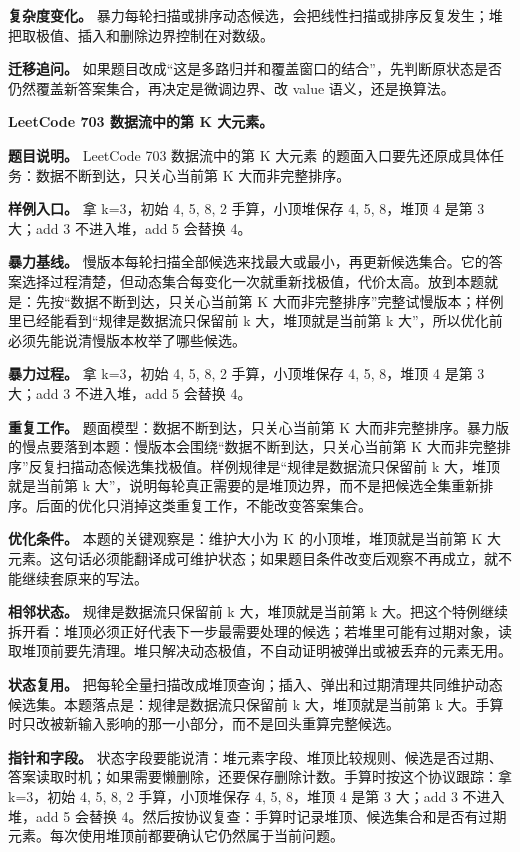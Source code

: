 \textbf{复杂度变化。} 暴力每轮扫描或排序动态候选，会把线性扫描或排序反复发生；堆把取极值、插入和删除边界控制在对数级。

\textbf{迁移追问。} 如果题目改成“这是多路归并和覆盖窗口的结合”，先判断原状态是否仍然覆盖新答案集合，再决定是微调边界、改 value 语义，还是换算法。

\noindent\textbf{LeetCode 703 数据流中的第 K 大元素。}

\textbf{题目说明。} LeetCode 703 数据流中的第 K 大元素 的题面入口要先还原成具体任务：数据不断到达，只关心当前第 K 大而非完整排序。

\textbf{样例入口。} 拿 k=3，初始 4, 5, 8, 2 手算，小顶堆保存 4, 5, 8，堆顶 4 是第 3 大；add 3 不进入堆，add 5 会替换 4。

\textbf{暴力基线。} 慢版本每轮扫描全部候选来找最大或最小，再更新候选集合。它的答案选择过程清楚，但动态集合每变化一次就重新找极值，代价太高。放到本题就是：先按“数据不断到达，只关心当前第 K 大而非完整排序”完整试慢版本；样例里已经能看到“规律是数据流只保留前 k 大，堆顶就是当前第 k 大”，所以优化前必须先能说清慢版本枚举了哪些候选。

\textbf{暴力过程。} 拿 k=3，初始 4, 5, 8, 2 手算，小顶堆保存 4, 5, 8，堆顶 4 是第 3 大；add 3 不进入堆，add 5 会替换 4。

\textbf{重复工作。} 题面模型：数据不断到达，只关心当前第 K 大而非完整排序。暴力版的慢点要落到本题：慢版本会围绕“数据不断到达，只关心当前第 K 大而非完整排序”反复扫描动态候选集找极值。样例规律是“规律是数据流只保留前 k 大，堆顶就是当前第 k 大”，说明每轮真正需要的是堆顶边界，而不是把候选全集重新排序。后面的优化只消掉这类重复工作，不能改变答案集合。

\textbf{优化条件。} 本题的关键观察是：维护大小为 K 的小顶堆，堆顶就是当前第 K 大元素。这句话必须能翻译成可维护状态；如果题目条件改变后观察不再成立，就不能继续套原来的写法。

\textbf{相邻状态。} 规律是数据流只保留前 k 大，堆顶就是当前第 k 大。把这个特例继续拆开看：堆顶必须正好代表下一步最需要处理的候选；若堆里可能有过期对象，读取堆顶前要先清理。堆只解决动态极值，不自动证明被弹出或被丢弃的元素无用。

\textbf{状态复用。} 把每轮全量扫描改成堆顶查询；插入、弹出和过期清理共同维护动态候选集。本题落点是：规律是数据流只保留前 k 大，堆顶就是当前第 k 大。手算时只改被新输入影响的那一小部分，而不是回头重算完整候选。

\textbf{指针和字段。} 状态字段要能说清：堆元素字段、堆顶比较规则、候选是否过期、答案读取时机；如果需要懒删除，还要保存删除计数。手算时按这个协议跟踪：拿 k=3，初始 4, 5, 8, 2 手算，小顶堆保存 4, 5, 8，堆顶 4 是第 3 大；add 3 不进入堆，add 5 会替换 4。然后按协议复查：手算时记录堆顶、候选集合和是否有过期元素。每次使用堆顶前都要确认它仍然属于当前问题。

